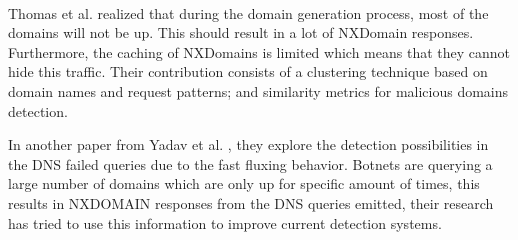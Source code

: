 \\
Thomas et al. \cite{dga4} realized that during the domain generation process, most of the domains will not be up. This should result in a lot of NXDomain responses. Furthermore, the caching of NXDomains is limited which means that they cannot hide this traffic. Their contribution consists of a clustering technique based on domain names and request patterns; and similarity metrics for malicious domains detection.

In another paper from Yadav et al. \cite{dnsfailure}, they explore the detection possibilities in the DNS failed queries due to the fast fluxing behavior. Botnets are querying a large number of domains which are only up for specific amount of times, this results in NXDOMAIN responses from the DNS queries emitted, their research has tried to use this information to improve current detection systems.


